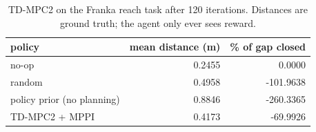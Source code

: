 \begin{table}[t]
\centering
\begin{tabular}{lrr}
\toprule
policy & mean distance (m) & \% of gap closed \\
\midrule
no-op & 0.2455 & 0.0000 \\
random & 0.4958 & -101.9638 \\
policy prior (no planning) & 0.8846 & -260.3365 \\
TD-MPC2 + MPPI & 0.4173 & -69.9926 \\
\bottomrule
\end{tabular}
\caption{TD-MPC2 on the Franka reach task after 120 iterations. Distances are ground truth; the agent only ever sees reward.}
\label{tab:tdmpc2-franka}
\end{table}
